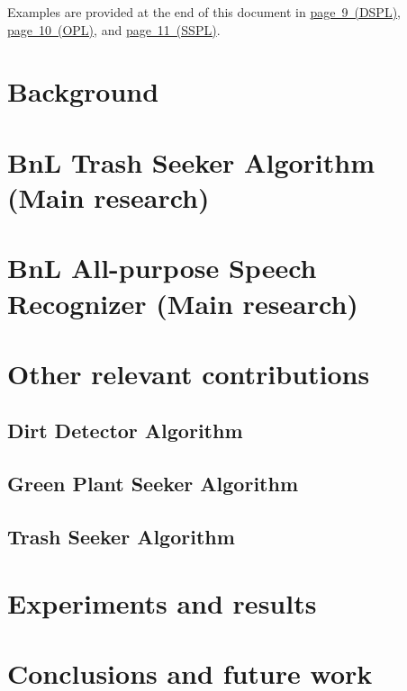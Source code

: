 \documentclass[runningheads,a4paper]{llncs}
\begin{document}
Examples are provided at the end of this document in
\hyperlink{page.9}{page~9~(DSPL)},
\hyperlink{page.10}{page~10~(OPL)}, and
\hyperlink{page.11}{page~11~(SSPL)}.


\section{Background}
\lipsum[1-2]

\section{BnL Trash Seeker Algorithm (Main research)}
\lipsum[4-5]

\section{BnL All-purpose Speech Recognizer (Main research)}
\lipsum[9-10]

\section{Other relevant contributions}
\lipsum[12]
\subsection{Dirt Detector Algorithm}
\lipsum[13]
\subsection{Green Plant Seeker Algorithm}
\lipsum[14]
\subsection{Trash Seeker Algorithm}
\lipsum[15]

\section{Experiments and results}
\lipsum[23-24]

\section{Conclusions and future work}
\lipsum[25]

%
%
\end{document}

